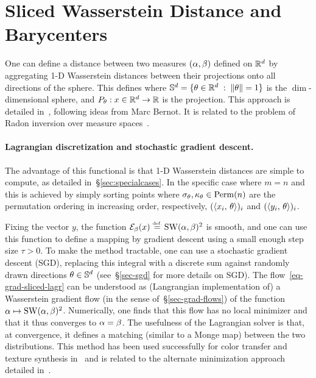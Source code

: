 \section{Sliced Wasserstein Distance and Barycenters}\label{sec-sliced}

One can define a distance between two measures $(\alpha,\beta)$ defined on $\mathbb{R}^d$ by aggregating 1-D Wasserstein distances between their projections onto all directions of the sphere. This defines
where $\mathbb{S}^d = \{ \theta \in \mathbb{R}^d \;:\; \left\| \theta \right\|=1 \}$ is the $\dim$-dimensional sphere, and $P_\theta : x \in \mathbb{R}^d \rightarrow \mathbb{R}$ is the projection. This approach is detailed in~\citep{2013-Bonneel-barycenter}, following ideas from Marc Bernot. It is related to the problem of Radon inversion over measure spaces~\citep{AbrahamRadon}. 

\paragraph{Lagrangian discretization and stochastic gradient descent. }

The advantage of this functional is that 1-D Wasserstein distances are simple to compute, as detailed in~\S\ref{sec:specialcases}. In the specific case where $m=n$ and 
this is achieved by simply sorting points
where $\sigma_\theta,\kappa_\theta \in \mathrm{Perm}(n)$ are the permutation ordering in increasing order, respectively, $(\langle x_i,\,\theta\rangle)_i$ and $(\langle y_i,\,\theta\rangle)_i$. 

Fixing the vector $y$, the function $\Ee_\be(x) \eqdef \SW(\al,\be)^2$ is smooth, and one can use this function to define a mapping by gradient descent 
using a small enough step size $\tau>0$. 
%
To make the method tractable, one can use a stochastic gradient descent (SGD), replacing this integral with a discrete sum against randomly drawn directions $\theta \in \mathbb{S}^d$ (see~\S\ref{sec-sgd} for more details on SGD). 
%
The flow~\eqref{eq-grad-sliced-lagr} can be understood as (Langrangian implementation of) a Wasserstein gradient flow (in the sense of~\S\ref{sec-grad-flows}) of the function $\alpha \mapsto \operatorname{SW}(\alpha,\beta)^2$. Numerically, one finds that this flow has no local minimizer and that it thus converges to $\alpha=\beta$. The usefulness of the Lagrangian solver is that, at convergence, it defines a matching (similar to a Monge map) between the two distributions. This method has been used successfully for color transfer and texture synthesis in~\citep{rabin-ssvm-11} and is related to the alternate minimization approach detailed in~\citep{pitie2007automated}.

